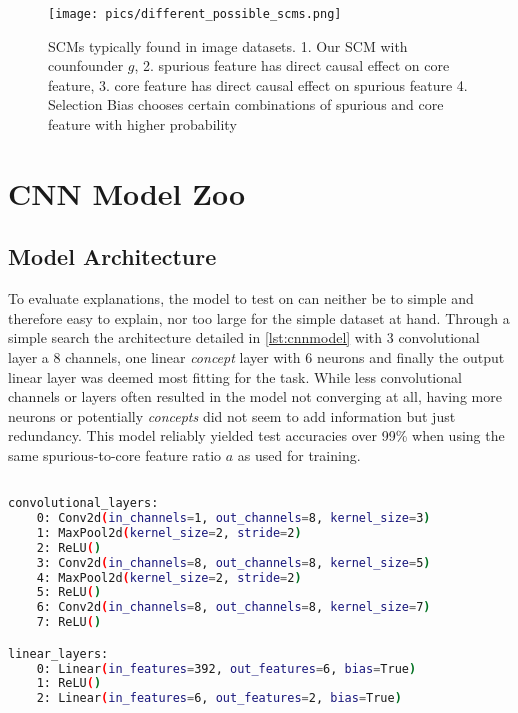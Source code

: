 \begin{figure}[H]
    \centering
    \texttt{[image: pics/different\_possible\_scms.png]}
    \caption{SCMs typically found in image datasets. 
    1. Our SCM with counfounder $g$, 
    2. spurious feature has direct causal effect on core feature, 
    3. core feature has direct causal effect on spurious feature 4. Selection Bias chooses certain combinations of spurious and core feature with higher probability}
    \label{fig:possible_scms}
\end{figure}

\section{CNN Model Zoo}
\subsection{Model Architecture}
To evaluate explanations, the model to test on can neither be to simple and therefore easy to explain, nor too large for the simple dataset at hand. 
Through a simple search the architecture detailed in \autoref{lst:cnnmodel} with 3 convolutional layer a 8 channels, one linear \textit{concept} layer with 6 neurons and finally the output linear layer was deemed most fitting for the task. While less convolutional channels or layers often resulted in the model not converging at all, having more neurons or potentially \textit{concepts} did not seem to add information but just redundancy. 
This model reliably yielded test accuracies over 99\% when using the same spurious-to-core feature ratio $a$ as used for training.

\begin{lstlisting}[language=bash, label=lst:cnnmodel]

convolutional_layers: 
    0: Conv2d(in_channels=1, out_channels=8, kernel_size=3)
    1: MaxPool2d(kernel_size=2, stride=2)
    2: ReLU()
    3: Conv2d(in_channels=8, out_channels=8, kernel_size=5)
    4: MaxPool2d(kernel_size=2, stride=2)
    5: ReLU()
    6: Conv2d(in_channels=8, out_channels=8, kernel_size=7)
    7: ReLU()

linear_layers:
    0: Linear(in_features=392, out_features=6, bias=True)
    1: ReLU()
    2: Linear(in_features=6, out_features=2, bias=True)  

\end{lstlisting}

